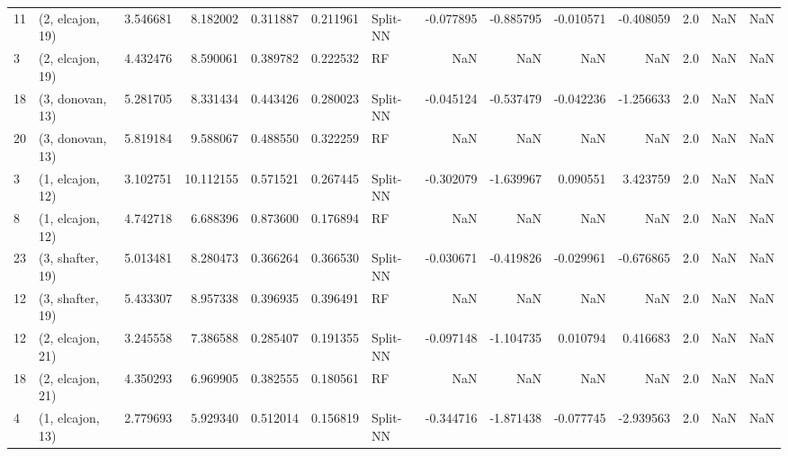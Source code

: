 \begin{tabular}{llrrrrlrrrrrrl}
11 &  (2, elcajon, 19) &   3.546681 &   8.182002 &   0.311887 &  0.211961 &    Split-NN &       -0.077895 &     -0.885795 &      -0.010571 &    -0.408059 &            2.0 &    NaN &              NaN \\
3  &  (2, elcajon, 19) &   4.432476 &   8.590061 &   0.389782 &  0.222532 &          RF &             NaN &           NaN &            NaN &          NaN &            2.0 &    NaN &              NaN \\
18 &  (3, donovan, 13) &   5.281705 &   8.331434 &   0.443426 &  0.280023 &    Split-NN &       -0.045124 &     -0.537479 &      -0.042236 &    -1.256633 &            2.0 &    NaN &              NaN \\
20 &  (3, donovan, 13) &   5.819184 &   9.588067 &   0.488550 &  0.322259 &          RF &             NaN &           NaN &            NaN &          NaN &            2.0 &    NaN &              NaN \\
3  &  (1, elcajon, 12) &   3.102751 &  10.112155 &   0.571521 &  0.267445 &    Split-NN &       -0.302079 &     -1.639967 &       0.090551 &     3.423759 &            2.0 &    NaN &              NaN \\
8  &  (1, elcajon, 12) &   4.742718 &   6.688396 &   0.873600 &  0.176894 &          RF &             NaN &           NaN &            NaN &          NaN &            2.0 &    NaN &              NaN \\
23 &  (3, shafter, 19) &   5.013481 &   8.280473 &   0.366264 &  0.366530 &    Split-NN &       -0.030671 &     -0.419826 &      -0.029961 &    -0.676865 &            2.0 &    NaN &              NaN \\
12 &  (3, shafter, 19) &   5.433307 &   8.957338 &   0.396935 &  0.396491 &          RF &             NaN &           NaN &            NaN &          NaN &            2.0 &    NaN &              NaN \\
12 &  (2, elcajon, 21) &   3.245558 &   7.386588 &   0.285407 &  0.191355 &    Split-NN &       -0.097148 &     -1.104735 &       0.010794 &     0.416683 &            2.0 &    NaN &              NaN \\
18 &  (2, elcajon, 21) &   4.350293 &   6.969905 &   0.382555 &  0.180561 &          RF &             NaN &           NaN &            NaN &          NaN &            2.0 &    NaN &              NaN \\
4  &  (1, elcajon, 13) &   2.779693 &   5.929340 &   0.512014 &  0.156819 &    Split-NN &       -0.344716 &     -1.871438 &      -0.077745 &    -2.939563 &            2.0 &    NaN &              NaN \\

\end{tabular}
